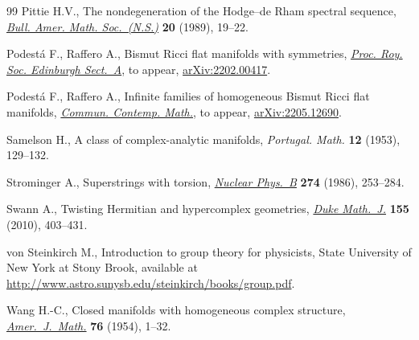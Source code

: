 \begin{thebibliography}{99}
Pittie H.V., The nondegeneration of the {H}odge--de {R}ham spectral sequence,
 \href{https://doi.org/10.1090/S0273-0979-1989-15683-8}{\textit{Bull. Amer. Math. Soc.~(N.S.)}} \textbf{20} (1989), 19--22.

Podest\'a F., Raffero A., Bismut {R}icci flat manifolds with symmetries,
 \href{https://doi.org/10.1017/prm.2022.49}{\textit{Proc. Roy. Soc. Edinburgh Sect.~A}}, {t}o appear, \href{https://arxiv.org/abs/2202.00417}{arXiv:2202.00417}.

Podest\'a F., Raffero A., Infinite families of homogeneous {B}ismut {R}icci
 flat manifolds, \href{https://doi.org/10.1142/S0219199722500754}{\textit{Commun. Contemp. Math.}}, {t}o appear,
 \href{https://arxiv.org/abs/2205.12690}{arXiv:2205.12690}.

Samelson H., A class of complex-analytic manifolds, \textit{Portugal. Math.}
 \textbf{12} (1953), 129--132.

Strominger A., Superstrings with torsion, \href{https://doi.org/10.1016/0550-3213(86)90286-5}{\textit{Nuclear Phys.~B}} \textbf{274}
 (1986), 253--284.

Swann A., Twisting {H}ermitian and hypercomplex geometries, \href{https://doi.org/10.1215/00127094-2010-059}{\textit{Duke
 Math.~J.}} \textbf{155} (2010), 403--431.

von Steinkirch M., Introduction to group theory for physicists, {S}tate
 University of New York at Stony Brook, available at
 \url{http://www.astro.sunysb.edu/steinkirch/books/group.pdf}.

Wang H.-C., Closed manifolds with homogeneous complex structure,
 \href{https://doi.org/10.2307/2372397}{\textit{Amer.~J.~Math.}} \textbf{76} (1954), 1--32.

\end{thebibliography}
